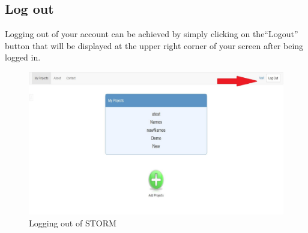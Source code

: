 \subsection{Log out}\par
Logging out of your account can be achieved by simply clicking on the``Logout'' button that will be displayed at the upper right corner of your screen after being logged in.
 \begin{figure}[H] 
	\centering
	\includegraphics[width=13cm]{./graphics/Logout.jpg}\par
	\caption{Logging out of STORM}
\end{figure}

\newpage

